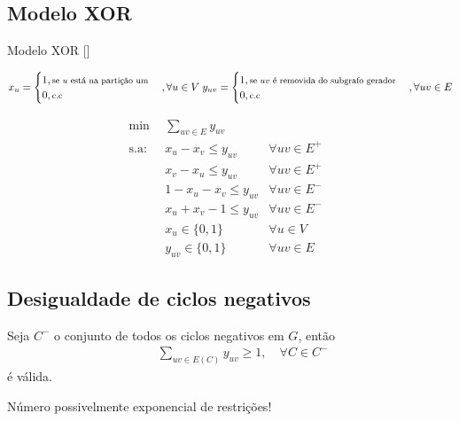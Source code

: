 \documentclass[
12pt,notheorems,hyperref={pdfauthor=whatever}
]{beamer}
\begin{document}
\subsection{Modelo XOR}
\begin{frame}
    \begin{block}{Modelo XOR [\cite{aref2020modeling}]}
        \begingroup
            \begin{center}
                \footnotesize
                $x_u=
                \begin{cases}
                    1, \text{\footnotesize se $u$ está na partição um}\\
                    0, \text{\footnotesize c.c}
                \end{cases}
                \text{$,\forall u \in V$}
                \;
                y_{uv}=
                \begin{cases}
                    1, \text{\footnotesize se $uv$ é removida do subgrafo gerador}\\
                    0, \text{\footnotesize c.c}
                \end{cases}
                \text{$, \forall uv \in E$}
                $
            \end{center}
            \begin{align} 
                 \min\:\:&\sum_{uv \in E} y_{uv} & & \\
                \text{s.a}:\:&x_u-x_v \leq y_{uv} &\forall uv\in E^+ \label{eq:pos1}\\
                &x_v-x_u \leq y_{uv} &\forall uv\in E^+ \label{eq:pos2}\\
                &1 - x_u - x_v \leq y_{uv} &\forall uv\in E^- \label{eq:neg1}\\
                & x_u+x_v -1 \leq y_{uv} &\forall uv\in E^- \label{eq:neg2}\\
                &x_u \in \{0,1\} &\forall u \in V\\
                &y_{uv} \in \{0,1\} &\forall uv \in E \label{eq:ybin}
            \end{align}  
        \endgroup
    \end{block}
\end{frame}

\subsection{Desigualdade de ciclos negativos}
\begin{frame}
    Seja $C^-$ o conjunto de todos os ciclos negativos em $G$, então
    \vspace{1em}
    \begin{align}
		\qquad \sum_{uv \in E(C)} y_{uv} \geq 1,\quad\forall C \in C^- \label{NEC}
	\end{align}
    é válida.

    \pause
    \vspace{1em}
    {\alert{Número possivelmente exponencial de restrições!}}
    
\end{frame}
\end{document}
